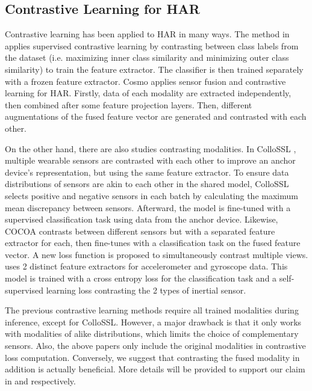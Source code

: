 \documentclass[conference]{IEEEtran}
\begin{document}
\subsection{Contrastive Learning for HAR}
\label{subsec: contrast for har}
Contrastive learning has been applied to HAR in many ways.
The method in \cite{Hamad2023} applies supervised contrastive learning by contrasting between class labels from the dataset (i.e. maximizing inner class similarity and minimizing outer class similarity) to train the feature extractor. The classifier is then trained separately with a frozen feature extractor.
Cosmo \cite{Ouyang2022} applies sensor fusion and contrastive learning for HAR. Firstly, data of each modality are extracted independently, then combined after some feature projection layers. Then, different augmentations of the fused feature vector are generated and contrasted with each other.

On the other hand, there are also studies contrasting modalities. In ColloSSL \cite{Jain2022}, multiple wearable sensors are contrasted with each other to improve an anchor device's representation, but using the same feature extractor. To ensure data distributions of sensors are akin to each other in the shared model, ColloSSL selects positive and negative sensors in each batch by calculating the maximum mean discrepancy between sensors. Afterward, the model is fine-tuned with a supervised classification task using data from the anchor device. Likewise, COCOA \cite{Deldari2022} contrasts between different sensors but with a separated feature extractor for each, then fine-tunes with a classification task on the fused feature vector. A new loss function is proposed to simultaneously contrast multiple views. \cite{Koo2023} uses 2 distinct feature extractors for accelerometer and gyroscope data. This model is trained with a cross entropy loss for the classification task and a self-supervised learning loss contrasting the 2 types of inertial sensor.

The previous contrastive learning methods require all trained modalities during inference, except for ColloSSL. However, a major drawback is that it only works with modalities of alike distributions, which limits the choice of complementary sensors. Also, the above papers only include the original modalities in contrastive loss computation. Conversely, we suggest that contrasting the fused modality in addition is actually beneficial. More details will be provided to support our claim in  and  respectively.
\end{document}
